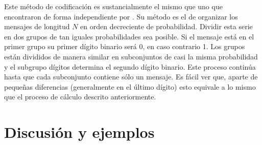 Este m\'etodo de codificaci\'on es sustancialmente el mismo que uno
que encontraron de forma independiente por \citet{fano}. Su m\'etodo es
el de organizar los mensajes de longitud $N$ en orden decreciente de
probabilidad. Dividir esta serie en dos grupos de tan iguales
probabilidades sea posible. Si el mensaje est\'a en el primer grupo su
primer d\'igito binario ser\'a 0, en caso contrario 1. Los grupos
est\'an divididos de manera similar en subconjuntos de casi la misma
probabilidad y el subgrupo d\'igitos determina el segundo d\'igito
binario. Este proceso contin\'ua hasta que cada subconjunto contiene
s\'olo un mensaje. Es f\'acil ver que, aparte de peque\~{n}as
diferencias (generalmente en el \'ultimo d\'igito) esto equivale a lo
mismo que el proceso de c\'alculo descrito anteriormente.

\section{Discusi\'on y ejemplos}

